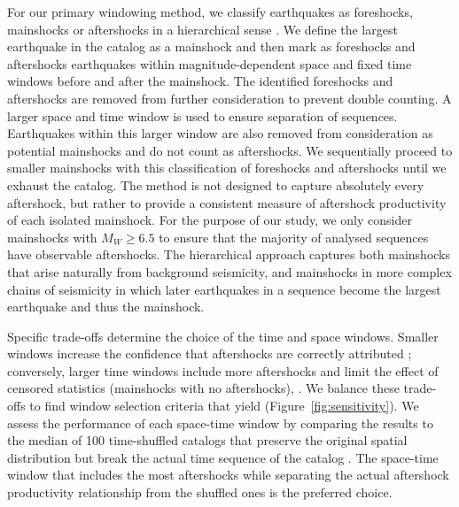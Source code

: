 \documentclass[draft, jgrga]{agujournal2018}
\begin{document}
For our primary windowing method, we classify earthquakes as foreshocks, mainshocks or aftershocks in a hierarchical sense \citep[following][]{felzer2006decay, Brodsky2011TheForeshocks, Wetzler2016, Garza-Giron2018Mainshock-AftershockRegions}. We define the largest earthquake in the catalog as a mainshock and then mark as foreshocks and aftershocks earthquakes within magnitude-dependent space and fixed time windows before and after the mainshock. The identified foreshocks and aftershocks are removed from further consideration to prevent double counting. A larger space and time window is used to ensure separation of sequences. Earthquakes within this larger window are also removed from consideration as potential mainshocks and do not count as aftershocks. We sequentially proceed to smaller mainshocks with this classification of foreshocks and aftershocks until we exhaust the catalog. The method is not designed to capture absolutely every aftershock, but rather to provide a consistent measure of aftershock productivity of each isolated mainshock. For the purpose of our study, we only consider mainshocks with $M_W\ge6.5$ to ensure that the majority of analysed sequences have observable aftershocks. The hierarchical approach captures both mainshocks that arise naturally from background seismicity, and mainshocks in more complex chains of seismicity in which later earthquakes in a sequence become the largest earthquake and thus the mainshock.

Specific trade-offs determine the choice of the time and space windows. Smaller windows increase the confidence that aftershocks are correctly attributed ; conversely, larger time windows include more aftershocks and limit the effect of censored statistics (mainshocks with no aftershocks), . We balance these trade-offs to find window selection criteria that yield  (Figure~\ref{fig:sensitivity}). We assess the performance of each space-time window by comparing the results to the median of 100 time-shuffled catalogs that preserve the original spatial distribution but break the actual time sequence of the catalog \citep{Garza-Giron2018Mainshock-AftershockRegions}.  The space-time window that includes the most aftershocks while separating the actual aftershock productivity relationship from the shuffled ones is the preferred choice.
  
\end{document}

